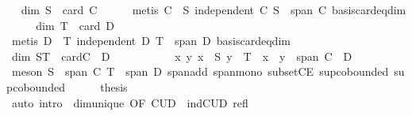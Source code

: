 \begin{isabellebody}
\ \isamarkupfalse%
\ {\isachardoublequoteopen}dim\ S\ {\isacharequal}{\kern0pt}\ card\ C{\isachardoublequoteclose}\isanewline
\ \ \ \ \isamarkupfalse%
\ {\isacharparenleft}{\kern0pt}metis\ {\isacartoucheopen}C\ {\isasymsubseteq}\ S{\isacartoucheclose}\ {\isacartoucheopen}independent\ C{\isacartoucheclose}\ {\isacartoucheopen}S\ {\isasymsubseteq}\ span\ C{\isacartoucheclose}\ basis{\isacharunderscore}{\kern0pt}card{\isacharunderscore}{\kern0pt}eq{\isacharunderscore}{\kern0pt}dim{\isacharparenright}{\kern0pt}\isanewline
\ \ \isamarkupfalse%
\ \isamarkupfalse%
\ {\isachardoublequoteopen}dim\ T\ {\isacharequal}{\kern0pt}\ card\ D{\isachardoublequoteclose}\isanewline
\ \ \ \ \isamarkupfalse%
\ {\isacharparenleft}{\kern0pt}metis\ {\isacartoucheopen}D\ {\isasymsubseteq}\ T{\isacartoucheclose}\ {\isacartoucheopen}independent\ D{\isacartoucheclose}\ {\isacartoucheopen}T\ {\isasymsubseteq}\ span\ D{\isacartoucheclose}\ basis{\isacharunderscore}{\kern0pt}card{\isacharunderscore}{\kern0pt}eq{\isacharunderscore}{\kern0pt}dim{\isacharparenright}{\kern0pt}\isanewline
\ \ \isamarkupfalse%
\ \isamarkupfalse%
\ {\isachardoublequoteopen}dim\ {\isacharquery}{\kern0pt}ST\ {\isacharequal}{\kern0pt}\ card{\isacharparenleft}{\kern0pt}C\ {\isasymunion}\ D{\isacharparenright}{\kern0pt}{\isachardoublequoteclose}\isanewline
\ \ \isamarkupfalse%
\ {\isacharminus}{\kern0pt}\isanewline
\ \ \ \ \isamarkupfalse%
\ {\isacharasterisk}{\kern0pt}{\isacharcolon}{\kern0pt}\ {\isachardoublequoteopen}{\isasymAnd}x\ y{\isachardot}{\kern0pt}\ {\isasymlbrakk}x\ {\isasymin}\ S{\isacharsemicolon}{\kern0pt}\ y\ {\isasymin}\ T{\isasymrbrakk}\ {\isasymLongrightarrow}\ x\ {\isacharplus}{\kern0pt}\ y\ {\isasymin}\ span\ {\isacharparenleft}{\kern0pt}C\ {\isasymunion}\ D{\isacharparenright}{\kern0pt}{\isachardoublequoteclose}\isanewline
\ \ \ \ \ \ \isamarkupfalse%
\ {\isacharparenleft}{\kern0pt}meson\ {\isacartoucheopen}S\ {\isasymsubseteq}\ span\ C{\isacartoucheclose}\ {\isacartoucheopen}T\ {\isasymsubseteq}\ span\ D{\isacartoucheclose}\ span{\isacharunderscore}{\kern0pt}add\ span{\isacharunderscore}{\kern0pt}mono\ subsetCE\ sup{\isachardot}{\kern0pt}cobounded{}\ sup{\isachardot}{\kern0pt}cobounded{}{\isacharparenright}{\kern0pt}\isanewline
\ \ \ \ \isamarkupfalse%
\ {\isacharquery}{\kern0pt}thesis\isanewline
\ \ \ \ \ \ \isamarkupfalse%
\ {\isacharparenleft}{\kern0pt}auto\ intro{\isacharcolon}{\kern0pt}\ {\isacharasterisk}{\kern0pt}\ dim{\isacharunderscore}{\kern0pt}unique\ {\isacharbrackleft}{\kern0pt}OF\ CUD\ {\isacharunderscore}{\kern0pt}\ indCUD\ refl{\isacharbrackright}{\kern0pt}{\isacharparenright}{\kern0pt}\isanewline

\end{isabellebody}
